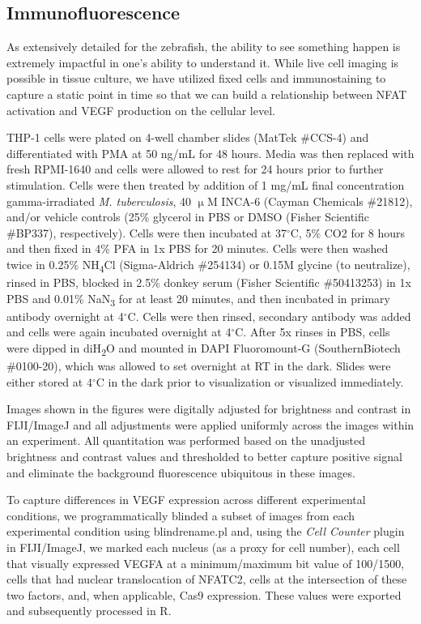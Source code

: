 \subsection{Immunofluorescence}\label{immunofluorescence}

As extensively detailed for the zebrafish, the ability to see something happen is extremely impactful in one's ability to understand it. While live cell imaging is possible in tissue culture, we have utilized fixed cells and immunostaining to capture a static point in time so that we can build a relationship between NFAT activation and VEGF production on the cellular level. 

THP-1 cells were plated on 4-well chamber slides (MatTek \#CCS-4) and differentiated with PMA at 50 ng/mL for 48 hours. Media was then replaced with fresh RPMI-1640 and cells were allowed to rest for 24 hours prior to further stimulation. Cells were then treated by addition of 1 mg/mL final concentration gamma-irradiated \textit{M. tuberculosis}, 40 $\upmu$M INCA-6 (Cayman Chemicals \#21812), and/or vehicle controls (25\% glycerol in PBS or DMSO (Fisher Scientific \#BP337), respectively). Cells were then incubated at 37$^{\circ}$C, 5\% CO2 for 8 hours and then fixed in 4\% PFA in 1x PBS for 20 minutes. Cells were then washed twice in 0.25\% NH\textsubscript{4}Cl (Sigma-Aldrich \#254134) or 0.15M glycine (to neutralize), rinsed in PBS, blocked in 2.5\% donkey serum (Fisher Scientific \#50413253) in 1x PBS and 0.01\% NaN\textsubscript{3} for at least 20 minutes, and then incubated in primary antibody overnight at 4$^{\circ}$C. Cells were then rinsed, secondary antibody was added and cells were again incubated overnight at 4$^{\circ}$C. After 5x rinses in PBS, cells were dipped in diH\textsubscript{2}O and mounted in DAPI Fluoromount-G (SouthernBiotech \#0100-20), which was allowed to set overnight at RT in the dark. Slides were either stored at 4$^{\circ}$C in the dark prior to visualization or visualized immediately. 

Images shown in the figures were digitally adjusted for brightness and contrast in FIJI/ImageJ \citep{Schindelin2012} and all adjustments were applied uniformly across the images within an experiment. All quantitation was performed based on the unadjusted brightness and contrast values and thresholded to better capture positive signal and eliminate the background fluorescence ubiquitous in these images.

To capture differences in VEGF expression across different experimental conditions, we programmatically blinded a subset of images from each experimental condition using blindrename.pl \citep{Salter2016} and, using the \textit{Cell Counter} plugin in FIJI/ImageJ, we marked each nucleus (as a proxy for cell number), each cell that visually expressed VEGFA at a minimum/maximum bit value of 100/1500, cells that had nuclear translocation of NFATC2, cells at the intersection of these two factors, and, when applicable, Cas9 expression. These values were exported and subsequently processed in R.

